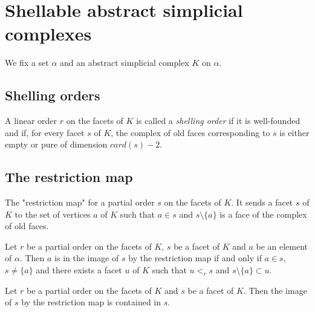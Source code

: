 \section{Shellable abstract simplicial complexes}

We fix a set $\alpha$ and an abstract simplicial complex $K$ on $\alpha$.

\subsection{Shelling orders}

\begin{subdefi}[IsShellingOrder]
A linear order $r$ on the facets of $K$ is called a \emph{shelling order} if it is well-founded and if, for
every facet $s$ of $K$, the complex of old faces corresponding to $s$ is either empty or pure of dimension
$card(s)-2$.

\end{subdefi}


\subsection{The restriction map}

\begin{subdefi}
The "restriction map" for a partial order $s$ on the facets of $K$. It sends a facet $s$ of $K$ to the set
of vertices $a$ of $K$ such that $a\in s$ and $s\setminus\{a\}$ is a face of the complex of old faces.

\end{subdefi}

\begin{sublemma}
Let $r$ be a partial order on the facets of $K$, $s$ be a facet of $K$ and $a$ be an element of $\alpha$. Then $a$ is
in the image of $s$ by the restriction map if and only if $a\in s$, $s\ne\{a\}$ and there exists a facet $u$ of $K$ such
that $u<_r s$ and $s\setminus\{a\}\subset u$.

\end{sublemma}

\begin{sublemma}
Let $r$ be a partial order on the facets of $K$ and $s$ be a facet of $K$. Then the image of $s$ by the restriction map is
contained in $s$.

\end{sublemma}


